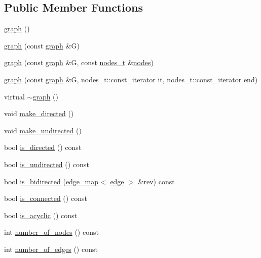\subsection*{Public Member Functions}
\begin{DoxyCompactItemize}
\item 
\mbox{\hyperlink{classgraph_a5a16b3cd1bfb376b0ec6be2ee2ea6ab1}{graph}} ()
\item 
\mbox{\hyperlink{classgraph_a4339b04667a9977110e59a1326b0e2d5}{graph}} (const \mbox{\hyperlink{classgraph}{graph}} \&G)
\item 
\mbox{\hyperlink{classgraph_a05af875b45eb2534f06a42dd1a6783c6}{graph}} (const \mbox{\hyperlink{classgraph}{graph}} \&G, const \mbox{\hyperlink{edge_8h_a22ac17689106ba21a84e7bc54d1199d6}{nodes\+\_\+t}} \&\mbox{\hyperlink{classgraph_a4ea0592e8eb7c26c5abad24546907726}{nodes}})
\item 
\mbox{\hyperlink{classgraph_ae4659f3efed5c60e85a19136f8f80a63}{graph}} (const \mbox{\hyperlink{classgraph}{graph}} \&G, nodes\+\_\+t\+::const\+\_\+iterator it, nodes\+\_\+t\+::const\+\_\+iterator end)
\item 
virtual \mbox{\hyperlink{classgraph_aeb62eaf197cdcb4800fa016eebc3d55a}{$\sim$graph}} ()
\item 
void \mbox{\hyperlink{classgraph_a1615678dee6248d6d8a00c553770b3bd}{make\+\_\+directed}} ()
\item 
void \mbox{\hyperlink{classgraph_a31c8b895bd842f1b9dcc67649956cfc7}{make\+\_\+undirected}} ()
\item 
bool \mbox{\hyperlink{classgraph_afc510be7479fa903fde9e0e615470ab0}{is\+\_\+directed}} () const
\item 
bool \mbox{\hyperlink{classgraph_aba427ff8ba0f70c68416ec1351344cd8}{is\+\_\+undirected}} () const
\item 
bool \mbox{\hyperlink{classgraph_a8014a8073dd640c91cbd4fc1fb6e6071}{is\+\_\+bidirected}} (\mbox{\hyperlink{classedge__map}{edge\+\_\+map}}$<$ \mbox{\hyperlink{classedge}{edge}} $>$ \&rev) const
\item 
bool \mbox{\hyperlink{classgraph_a599e2bf967df8a2052a9892c94db98b7}{is\+\_\+connected}} () const
\item 
bool \mbox{\hyperlink{classgraph_a9b500cb72826fe5bbefa8c71bc4642fa}{is\+\_\+acyclic}} () const
\item 
int \mbox{\hyperlink{classgraph_a42c78e0a9f115655e3ff0efe35ebfc4e}{number\+\_\+of\+\_\+nodes}} () const
\item 
int \mbox{\hyperlink{classgraph_aa4fcbe7bf572dc800068873ccfb4d95a}{number\+\_\+of\+\_\+edges}} () const

\end{DoxyCompactItemize}
